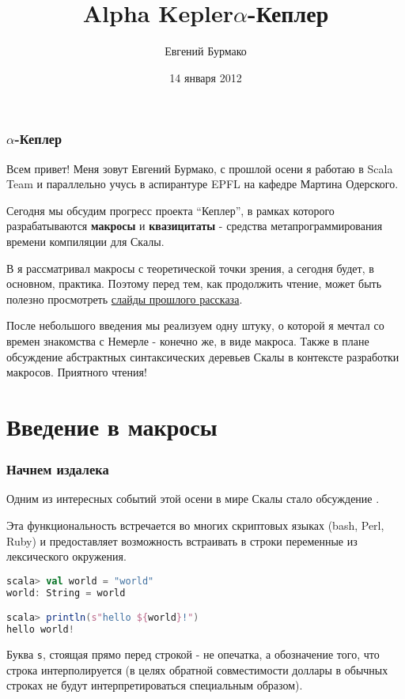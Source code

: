 \documentclass[hyperref={bookmarks=false}]{beamer}
\title{Alpha Kepler}
\begin{document}
\title{$\alpha$-Кеплер}
\author{Евгений Бурмако}
\date{14 января 2012}
\maketitle

\begin{frame}[t,fragile]
\frametitle{$\alpha$-Кеплер}

Всем привет! Меня зовут Евгений Бурмако, с прошлой осени я работаю в Scala Team и параллельно учусь в аспирантуре EPFL на кафедре Мартина Одерского.

Сегодня мы обсудим прогресс проекта ``Кеплер'', в рамках которого разрабатываются \textbf{макросы} и \textbf{квазицитаты} - средства метапрограммирования времени компиляции для Скалы.

В  я рассматривал макросы с теоретической точки зрения, а сегодня будет, в основном, практика. Поэтому перед тем, как продолжить чтение, может быть полезно просмотреть {\color{linkblue}\href{http://scalamacros.org/talks/2011-10-29-RuProjectKepler.pdf}{слайды прошлого рассказа}}.

После небольшого введения мы реализуем одну штуку, о которой я мечтал со времен знакомства с Немерле - конечно же, в виде макроса. Также в плане обсуждение абстрактных синтаксических деревьев Скалы в контексте разработки макросов. Приятного чтения!
\end{frame}

\section{Введение в макросы}

\begin{frame}[t,fragile]
\frametitle{Начнем издалека}

Одним из интересных событий этой осени в мире Скалы стало обсуждение .

Эта функциональность встречается во многих скриптовых языках (bash, Perl, Ruby) и предоставляет возможность встраивать в строки переменные из лексического окружения.

\begin{lstlisting}[language=scala]
scala> val world = "world"
world: String = world

scala> println(s"hello ${world}!")
hello world!
\end{lstlisting}%

Буква \texttt{s}, стоящая прямо перед строкой - не опечатка, а обозначение того, что строка интерполируется (в целях обратной совместимости доллары в обычных строках не будут интерпретироваться специальным образом).
\end{frame}
\end{document}
